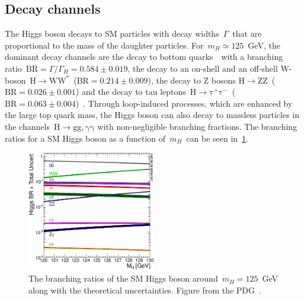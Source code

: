 \subsection{Decay channels}
The Higgs boson decays to SM particles with decay widths~$\Gamma$~that are proportional to the mass of the daughter particles. For~$m_H \simeq 125$~GeV, the dominant decay channels are the decay to bottom quarks~\Hbb~with a branching ratio~$\mathrm{BR} = \Gamma/\Gamma_{H} = 0.584 \pm 0.019$, the decay to an on-shell and an off-shell W-boson~$\mathrm{H}\rightarrow \mathrm{W} \mathrm{W}^*$~($\mathrm{BR} = 0.214\pm 0.009 $), the decay to Z bosons $\mathrm{H} \rightarrow \mathrm{Z} \mathrm{Z}$~($\mathrm{BR} = 0.026 \pm 0.001$) and the decay to tau leptons~$\mathrm{H} \rightarrow \mathrm{\tau}^+ \mathrm{\tau}^-$~($\mathrm{BR} = 0.063 \pm 0.004$)~\cite{Patrignani:2016xqp}. Through loop-induced processes, which are enhanced by the large top quark mass, the Higgs boson can also decay to massless particles in the channels~$\mathrm{H} \rightarrow \mathrm{g} \mathrm{g}, \mathrm{\gamma}\mathrm{\gamma}$ with non-negligible branching fractions. The branching ratios for a SM Higgs boson as a function of~$m_H$~can be seen in~\cref{fig:higgs_br}.

\begin{figure}
\begin{centering}
\includegraphics[width=0.5\textwidth]{figures/theory/higgs_br.eps}
\caption[The branching ratios of the Higgs boson]{The branching ratios of the SM Higgs boson around~$m_H = 125$~GeV along with the theoretical uncertainties. Figure from the PDG~\cite{Patrignani:2016xqp}.}
\label{fig:higgs_br}
\end{centering}
\end{figure}


